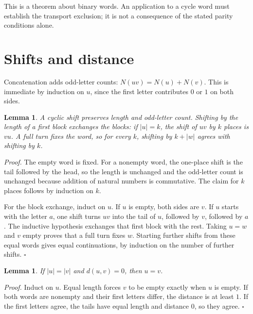 \documentclass[11pt,letterpaper]{article}
\newtheorem{lemma}[theorem]{Lemma}
\newenvironment{proof}{\noindent\textit{Proof.}}{\hfill\(\square\)}
\begin{document}
This is a theorem about binary words. An application to a cycle word must
establish the transport exclusion; it is not a consequence of the stated
parity conditions alone.

\section{Shifts and distance}

Concatenation adds odd-letter counts: \(N(uv)=N(u)+N(v)\). This is immediate by induction on \(u\), since the first letter contributes \(0\) or \(1\) on both sides.

\begin{lemma}
\label{lem:shift-basic}
A cyclic shift preserves length and odd-letter count. Shifting by the length
of a first block exchanges the blocks: if \(|u|=k\), the shift of \(uv\) by
\(k\) places is \(vu\). A full turn fixes the word, so for every \(k\),
shifting by \(k+|w|\) agrees with shifting by \(k\).
\end{lemma}

\begin{proof}
The empty word is fixed. For a nonempty word, the one-place shift is the tail followed by the head, so the length is unchanged and the odd-letter count is unchanged because addition of natural numbers is commutative. The claim for \(k\) places follows by induction on \(k\).

For the block exchange, induct on \(u\). If \(u\) is empty, both sides are \(v\). If \(u\) starts with the letter \(a\), one shift turns \(uv\) into the tail of \(u\), followed by \(v\), followed by \(a\). The inductive hypothesis exchanges that first block with the rest. Taking
\(u=w\) and \(v\) empty proves that a full turn fixes \(w\). Starting further
shifts from these equal words gives equal continuations, by induction on the
number of further shifts.
\end{proof}

\begin{lemma}
\label{lem:hamming-zero}
If \(|u|=|v|\) and \(d(u,v)=0\), then \(u=v\).
\end{lemma}

\begin{proof}
Induct on \(u\). Equal length forces \(v\) to be empty exactly when \(u\) is empty. If both words are nonempty and their first letters differ, the distance is at least \(1\). If the first letters agree, the tails have equal length and distance \(0\), so they agree.
\end{proof}
\end{document}
